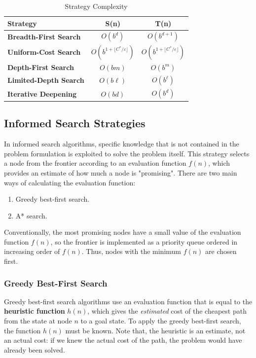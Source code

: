 \documentclass{article}
\begin{document}
\begin{table}[h]
    \centering
    \begin{tabular}{l||c|c}
        Strategy & S(n) & T(n) \\ \hline \hline
        \textbf{Breadth-First Search} & $O(b^d)$  & $O(b^{d+1})$ \\ \hline
        \textbf{Uniform-Cost Search} & $O(b^{1+\lfloor C^*/\varepsilon \rfloor})$ & $O(b^{1+\lfloor C^*/\varepsilon \rfloor})$ \\ \hline
        \textbf{Depth-First Search} & $O(bm)$ & $O(b^m)$ \\ \hline
        \textbf{Limited-Depth Search} & $O(b\ell)$ & $O(b^\ell)$ \\ \hline
        \textbf{Iterative Deepening} & $O(bd)$ & $O(b^d)$ \\
    \end{tabular}
    \caption{Strategy Complexity}
    \label{tab:strategy_complexity}
\end{table}

\subsection{Informed Search Strategies}
In informed search algorithms, specific knowledge that is not contained in the problem formulation is exploited to solve the problem itself. This strategy selects a node from the frontier according to an evaluation function $f(n)$, which provides an estimate of how much a node is "promising". There are two main ways of calculating the evaluation function:
\begin{enumerate}
    \item Greedy best-first search.
    \item A* search.
\end{enumerate}

Conventionally, the most promising nodes have a small value of the evaluation function $f(n)$, so the frontier is implemented as a priority queue ordered in increasing order of $f(n)$. Thus, nodes with the minimum $f(n)$ are chosen first.

\subsubsection{Greedy Best-First Search}
Greedy best-first search algorithms use an evaluation function that is equal to the \textbf{heuristic function} $h(n)$, which gives the \textit{estimated} cost of the cheapest path from the state at node $n$ to a goal state. To apply the greedy best-first search, the function $h(n)$ must be known. Note that, the heuristic is an estimate, not an actual cost: if we knew the actual cost of the path, the problem would have already been solved.
\end{document}
